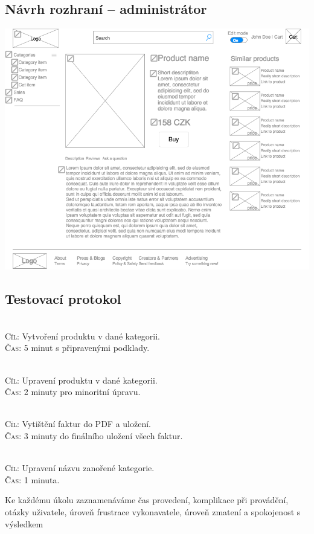 \documentclass[11pt,a4paper]{article}
\begin{document}
\subsection*{Návrh rozhraní -- administrátor}
\includegraphics[scale=0.6]{pyngshop_edit.png}
\newpage
\subsection*{Testovací protokol}
\\
\textsc{Cíl}: Vytvoření produktu v dané kategorii.\\
\textsc{Čas}: 5 minut s připravenými podklady.\\
\bigskip

\\
\textsc{Cíl}: Upravení produktu v dané kategorii.\\
\textsc{Čas}: 2 minuty pro minoritní úpravu.\\
\bigskip

\\
\textsc{Cíl}: Vytištění faktur do PDF a uložení.\\
\textsc{Čas}: 3 minuty do finálního uložení všech faktur.\\
\bigskip

\\
\textsc{Cíl}: Upravení názvu zanořené kategorie.\\
\textsc{Čas}: 1 minuta.\\
\bigskip

\noindent Ke každému úkolu zaznamenáváme čas provedení, komplikace při provádění, otázky uživatele, úroveň frustrace vykonavatele, úroveň zmatení a spokojenost s výsledkem
\end{document}
